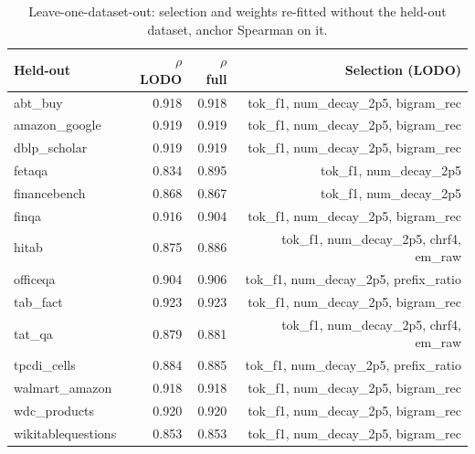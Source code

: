 \begin{table}[t]
\centering
\footnotesize
\caption{Leave-one-dataset-out: selection and weights re-fitted without the held-out dataset, anchor Spearman on it.}
\label{tab:lodo}

\begin{tabular}{lrrr}
\toprule
Held-out & $\rho$ LODO & $\rho$ full & Selection (LODO) \\
\midrule
abt\_buy & 0.918 & 0.918 & tok\_f1, num\_decay\_2p5, bigram\_rec \\
amazon\_google & 0.919 & 0.919 & tok\_f1, num\_decay\_2p5, bigram\_rec \\
dblp\_scholar & 0.919 & 0.919 & tok\_f1, num\_decay\_2p5, bigram\_rec \\
fetaqa & 0.834 & 0.895 & tok\_f1, num\_decay\_2p5 \\
financebench & 0.868 & 0.867 & tok\_f1, num\_decay\_2p5 \\
finqa & 0.916 & 0.904 & tok\_f1, num\_decay\_2p5, bigram\_rec \\
hitab & 0.875 & 0.886 & tok\_f1, num\_decay\_2p5, chrf4, em\_raw \\
officeqa & 0.904 & 0.906 & tok\_f1, num\_decay\_2p5, prefix\_ratio \\
tab\_fact & 0.923 & 0.923 & tok\_f1, num\_decay\_2p5, bigram\_rec \\
tat\_qa & 0.879 & 0.881 & tok\_f1, num\_decay\_2p5, chrf4, em\_raw \\
tpcdi\_cells & 0.884 & 0.885 & tok\_f1, num\_decay\_2p5, prefix\_ratio \\
walmart\_amazon & 0.918 & 0.918 & tok\_f1, num\_decay\_2p5, bigram\_rec \\
wdc\_products & 0.920 & 0.920 & tok\_f1, num\_decay\_2p5, bigram\_rec \\
wikitablequestions & 0.853 & 0.853 & tok\_f1, num\_decay\_2p5, bigram\_rec \\
\bottomrule
\end{tabular}

\end{table}